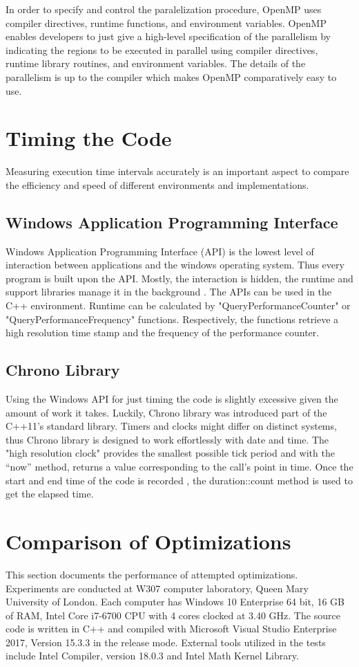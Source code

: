 \documentclass[12pt, oneside]{book}
\theoremstyle{plain}
\theoremstyle{definition}
\begin{document}
In order to specify and control the paralelization procedure, OpenMP uses compiler directives, runtime functions, and  envi­ronment variables. OpenMP enables developers to just give a high-level specification of the parallelism by indicating the regions to be executed in parallel using compiler directives, runtime library routines, and environment variables. The details of the parallelism is up to the compiler which makes OpenMP comparatively easy to use. 

\section{Timing the Code}
Measuring execution time intervals accurately is an important aspect to compare the efficiency and speed of different environments and implementations.

\subsection{Windows Application Programming Interface}
Windows Application Programming Interface (API) is the lowest level of interaction between applications and the windows operating system. Thus every program is built upon  the API. Mostly, the interaction is hidden, the runtime and support libraries manage it in the background \cite{windows}. The APIs can be used in the C++ environment. Runtime can be calculated by "QueryPerformanceCounter" or "QueryPerformanceFrequency"  functions. Respectively, the functions retrieve a high resolution time stamp and the frequency of the performance counter. 

\subsection{Chrono Library}
Using the Windows API for just timing the code is slightly excessive given the amount of work it takes. Luckily, Chrono library was introduced part of the C++11’s standard library.  Timers and clocks might differ on distinct systems, thus Chrono library is designed to work effortlessly with date and time. The "high resolution clock" provides the smallest possible tick period and with the “now” method, returns a value corresponding to the call’s point in time.  Once the start and end time of the code is recorded ,  the duration::count method is used to get the elapsed time.


\section{Comparison of Optimizations}
This section documents the performance of attempted optimizations. Experiments  are  conducted  at  W307 computer laboratory, Queen Mary University of London.  Each computer has Windows 10 Enterprise 64 bit, 16 GB of RAM, Intel Core i7-6700 CPU with 4 cores clocked at 3.40 GHz.  The source code is written in C++ and compiled with Microsoft Visual Studio Enterprise 2017, Version 15.3.3 in the release mode. External tools  utilized  in  the  tests  include Intel Compiler, version 18.0.3 and Intel Math Kernel  Library. 
\end{document}
